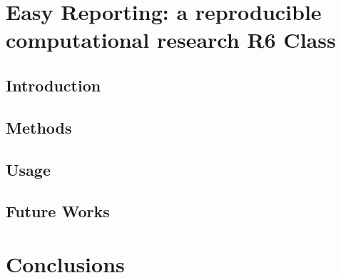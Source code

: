 \documentclass[b5paper,oneside,british,intoc,bibliograph=totoc,index=totoc,BCOR10mm,twoside,openright]{book}
\numberwithin{equation}{section}
\numberwithin{figure}{section}
\begin{document}
\chapter{Easy Reporting: a reproducible computational research R6 Class}

\section{Introduction} 

\section{Methods}

\section{Usage}

\section{Future Works}


\chapter{Conclusions}


%
%
%
%
%
%

%
%
%


\printbibliography[heading=bibnumbered]
\cleardoublepage

\printglossaries

\cleardoublepage
{}
\listoffigures

\cleardoublepage
{}
\listoftables

\end{document}
